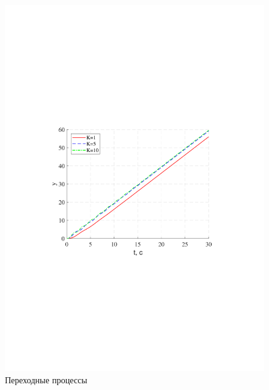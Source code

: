 \documentclass[a4paper,12pt]{article}
\begin{document}
	\begin{figure}[h!]
		\begin{center}
		\renewcommand{\figurename}{Рисунок}
		\includegraphics[width=5in]{ph2ast1MOD.pdf}
		\caption{Переходные процессы} 
		\label{s_11} 
		\end{center}
	\end{figure}
\end{document}
